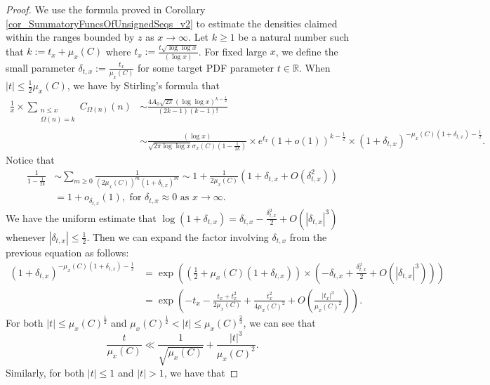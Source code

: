 \documentclass[11pt,reqno,a4letter]{article}
\numberwithin{figure}{section}
\numberwithin{table}{section}
\theoremstyle{plain}
\numberwithin{theorem}{section}
\theoremstyle{definition}
\begin{document}
\begin{proof}
We use the formula proved in Corollary \ref{cor_SummatoryFuncsOfUnsignedSeqs_v2} 
to estimate the densities claimed within the ranges bounded by 
$z$ as $x \rightarrow \infty$. 
Let $k \geq 1$ be a natural number such that $k := t_x + \mu_x(C)$ where 
$t_x := \frac{t \sqrt{\log\log x}}{(\log x)}$. 
For fixed large $x$, we define the small parameter $\delta_{t,x} := \frac{t_x}{\mu_x(C)}$ 
for some target PDF parameter $t \in \mathbb{R}$. 
When $|t| \leq \frac{1}{2} \mu_x(C)$, we have by Stirling's formula that 
\begin{align*} 
\frac{1}{x} \times \sum_{\substack{n \leq x \\ \Omega(n)=k}} C_{\Omega(n)}(n) & 
     \sim 
     \frac{4A_0\sqrt{2\pi} (\log\log x)^{k-\frac{1}{2}}}{(2k-1) (k-1)!} \\ 
     & \sim 
     \frac{(\log x)}{\sqrt{2\pi \log\log x} \sigma_x(C)  
     \left(1-\frac{1}{2k}\right)} \times e^{t_x} (1+o(1))^{k-\frac{1}{2}} \times 
     \left(1+\delta_{t,x}\right)^{-\mu_x(C)(1+\delta_{t,x})-\frac{1}{2}}. 
\end{align*} 
Notice that 
\begin{align*}
\frac{1}{1-\frac{1}{2k}} & \sim \sum_{m \geq 0} \frac{1}{(2 \mu_x(C))^m (1+\delta_{t,x})^m} 
     \sim 1 + \frac{1}{2 \mu_x(C)} \left(1+\delta_{t,x}+O(\delta_{t,x}^2)\right) \\ 
     & = 1 + o_{\delta_{t,x}}(1), 
     \text{\ for\ } \delta_{t,x} \approx 0 \text{\ as\ } x \rightarrow \infty. 
\end{align*}
We have the uniform estimate that 
$\log(1+\delta_{t,x}) = \delta_{t,x} - \frac{\delta_{t,x}^2}{2} + O(|\delta_{t,x}|^3)$ whenever 
$|\delta_{t,x}| \leq \frac{1}{2}$. Then we can expand the factor involving $\delta_{t,x}$ 
from the previous equation as follows: 
\begin{align*} 
(1+\delta_{t,x})^{-\mu_x(C) (1+\delta_{t,x}) - \frac{1}{2}} & = 
     \exp\left(\left(\frac{1}{2}+\mu_x(C) (1+\delta_{t,x})\right) \times 
     \left(-\delta_{t,x} + \frac{\delta_{t,x}^2}{2} + O(|\delta_{t,x}|^3)\right)\right) \\ 
     & = \exp\left(-t_x - \frac{t_x+t_x^2}{2\mu_x(C)} + \frac{t_x^2}{4\mu_x(C)^2} + 
     O\left(\frac{|t_x|^3}{\mu_x(C)^2}\right)\right). 
\end{align*} 
For both $|t| \leq \mu_x(C)^{\frac{1}{2}}$ and 
$\mu_x(C)^{\frac{1}{2}} < |t| \leq \mu_x(C)^{\frac{2}{3}}$, 
we can see that 
\[
\frac{t}{\mu_x(C)} \ll \frac{1}{\sqrt{\mu_x(C)}} + \frac{|t|^3}{\mu_x(C)^2}. 
\]
Similarly, for both  $|t| \leq 1$ and $|t| > 1$, we have that 

\end{proof}
\end{document}
